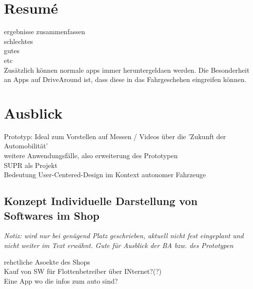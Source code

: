 \section{Resumé}
ergebnisse zusammenfassen\\
schlechtes\\
gutes\\
etc\\
Zusätzlich können normale apps immer heruntergeldaen werden. Die Besonderheit an Apps auf DriveAround ist, dass diese in das Fahrgeschehen eingreifen können.

\section{Ausblick}

Prototyp: Ideal zum Vorstellen auf Messen / Videos über die 'Zukunft der Automobilität'\\
weitere Anwendungsfälle, also erweiterung des Prototypen\\
SUPR als Projekt\\
Bedeutung User-Centered-Design im Kontext autonomer Fahrzeuge

\subsection{Konzept Individuelle Darstellung von Softwares im Shop}
\textit{Notiz: wird nur bei genügend Platz geschrieben, aktuell nicht fest eingeplant und nicht weiter im Text erwähnt. Gute für Ausblick der BA bzw. des Prototypen}

rehctliche Asoekte des Shops\\
Kauf von SW für Flottenbetreiber über INternet?(?)\\
Eine App wo die infos zum auto sind? \\